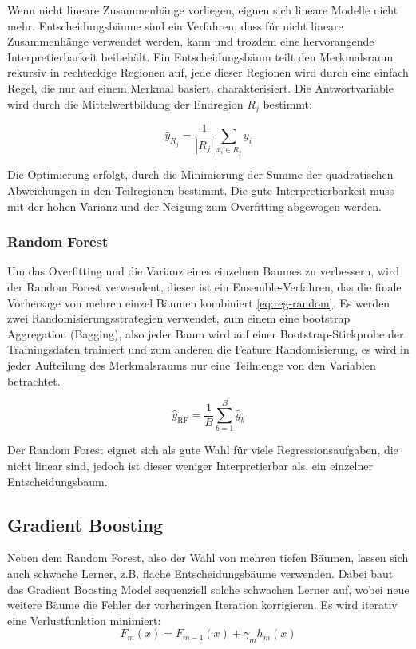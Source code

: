 Wenn nicht lineare Zusammenhänge vorliegen, eignen sich lineare Modelle nicht mehr. Entscheidungsbäume sind ein Verfahren, dass für nicht lineare Zusammenhänge verwendet werden, kann und trozdem eine hervorangende Interpretierbarkeit beibehält. Ein Entscheidungsbäum teilt den Merkmalsraum rekursiv in rechteckige Regionen auf, jede dieser Regionen wird durch eine einfach Regel, die nur auf einem Merkmal basiert, charakterisiert. Die Antwortvariable wird durch die Mittelwertbildung der Endregion \(R_j\) bestimmt:

\begin{equation}
\hat{y}_{R_j} = \frac{1}{|R_j|} \sum_{x_i \in R_j} y_i
\label{eq:reg-tree}
\end{equation}

Die Optimierung erfolgt, durch die Minimierung der Summe der quadratischen Abweichungen in den Teilregionen bestimmt. Die gute Interpretierbarkeit muss mit der hohen Varianz und der Neigung zum Overfitting abgewogen werden. \cite{Hastie2009}

\subsubsection{Random Forest}
Um das Overfitting und die Varianz eines einzelnen Baumes zu verbessern, wird der Random Forest verwendent, dieser ist ein Ensemble-Verfahren, das die finale Vorhersage von mehren einzel Bäumen kombiniert \ref{eq:reg-random}. Es werden zwei Randomisierungsstrategien verwendet, zum einem eine bootstrap Aggregation (Bagging), also jeder Baum wird auf einer Bootstrap-Stickprobe der Trainingsdaten trainiert und zum anderen die Feature Randomisierung, es wird in jeder Aufteilung des Merkmalsraums nur eine Teilmenge von den Variablen betrachtet. 

\begin{equation}
  \hat{y}_{\text{RF}} = \frac{1}{B} \sum_{b=1}^{B} \hat{y}_b
  \label{eq:reg-random}
\end{equation}

Der Random Forest eignet sich als gute Wahl für viele Regressionsaufgaben, die nicht linear sind, jedoch ist dieser weniger Interpretierbar als, ein einzelner Entscheidungsbaum. \cite{Hastie2009}

\subsection{Gradient Boosting}
Neben dem Random Forest, also der Wahl von mehren tiefen Bäumen, lassen sich auch schwache Lerner, z.B. flache Entscheidungsbäume verwenden. Dabei baut das Gradient Boosting Model sequenziell solche schwachen Lerner auf, wobei neue weitere Bäume die Fehler der vorheringen Iteration korrigieren. Es wird iterativ eine Verlustfunktion minimiert:
\begin{equation}
  F_m(x) = F_{m-1}(x) + \gamma_m h_m(x)
  \label{eq:reg-grad}
\end{equation}

